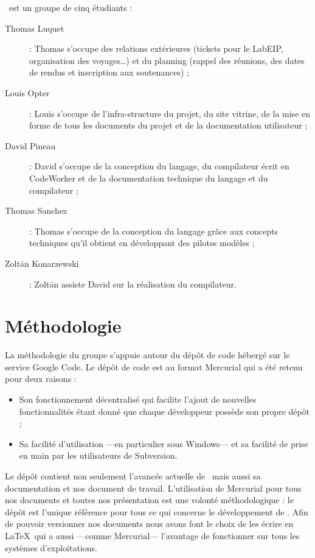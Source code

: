 \documentclass[francais]{rtxreport}
\begin{document}
\rtx\ est un groupe de cinq étudiants :
\begin{description}
\item[Thomas Luquet] : Thomas s'occupe des relations extérieures (tickets pour
  le LabEIP, organisation des voyages\ldots) et du planning (rappel des
  réunions, des dates de rendus et inscription aux soutenances) ;
\item[Louis Opter] : Louis s'occupe de l'infra-structure du projet, du site
  vitrine, de la mise en forme de tous les documents du projet et de la
  documentation utilisateur ;
\item[David Pineau] : David s'occupe de la conception du langage, du compilateur
  écrit en CodeWorker et de la documentation technique du langage et du
  compilateur ;
\item[Thomas Sanchez] : Thomas s'occupe de la conception du langage grâce aux
  concepts techniques qu'il obtient en développant des pilotes modèles ;
\item[Zolt\={a}n Konarzewski] : Zolt\={a}n assiste David sur la réalisation du
  compilateur.
\end{description}


\section{Méthodologie}

La méthodologie du groupe s'appuie autour du dépôt de code hébergé sur le
service Google Code. Le dépôt de code est au format Mercurial qui a été retenu
pour deux raisons :
\begin{itemize}
\item Son fonctionnement décentralisé qui facilite l'ajout de nouvelles
  fonctionnalités étant donné que chaque développeur possède son propre dépôt ;
\item Sa facilité d'utilisation ---en particulier sous Windows--- et sa facilité
  de prise en main par les utilisateurs de Subversion.
\end{itemize}

Le dépôt contient non seulement l'avancée actuelle de \rtx\ mais aussi sa
documentation et nos document de travail. L'utilisation de Mercurial pour tous
nos documents et toutes nos présentation est une volonté méthodologique : le
dépôt est l'unique référence pour tous ce qui concerne le développement de \rtx.
Afin de pouvoir versionner nos documents nous avons font le choix de les écrire
en \LaTeX\ qui a aussi ---comme Mercurial--- l'avantage de fonctionner sur tous
les systèmes d'exploitations.
\end{document}
